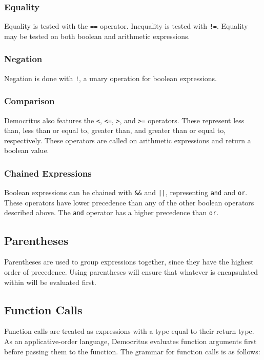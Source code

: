     \subsubsection{Equality}
            Equality is tested with the \texttt{==} operator. Inequality is tested with \texttt{!=}. Equality may be tested on both boolean and arithmetic expressions. 
			
		\subsubsection{Negation}
			Negation is done with \texttt{!}, a unary operation for boolean expressions. 

    \subsubsection{Comparison}
      Democritus also features the \verb|<|, \verb|<=|, \verb|>|, and \verb|>=| operators. These represent less than, less than or equal to, greater than, and greater than or equal to, respectively. These operators are called on arithmetic expressions and return a boolean value. 
            

      \subsubsection{Chained Expressions}
            Boolean expressions can be chained with \verb|&&| and \verb!||!, representing \texttt{and} and \texttt{or}. These operators have lower precedence than any of the other boolean operators described above. The \texttt{and} operator has a higher precedence than \texttt{or}.

  \subsection{Parentheses}
    Parentheses are used to group expressions together, since they have the highest order of precedence. Using parentheses will ensure that whatever is encapsulated within will be evaluated first.

  \subsection{Function Calls}
    Function calls are treated as expressions with a type equal to their return type. As an applicative-order language, Democritus evaluates function arguments first before passing them to the function. The grammar for function calls is as follows:

